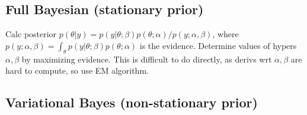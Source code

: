 \documentclass[11pt]{article}
\begin{document}
\begin{appendices}
\subsection{Full Bayesian (stationary prior)}
Calc posterior
$p(\theta | y) = p(y | \theta ; \beta) p(\theta ; \alpha) / p(y ; \alpha,
\beta)$, where
$p(y ; \alpha, \beta) = \int_\theta p(y | \theta ; \beta) p(\theta ; \alpha)$ is
the evidence. Determine values of hypers $\alpha, \beta$ by maximizing
evidence. This is difficult to do directly, as derivs wrt $\alpha, \beta$ are
hard to compute, so use EM algorithm.

\subsection{Variational Bayes (non-stationary prior)}

\end{appendices}
\end{document}
